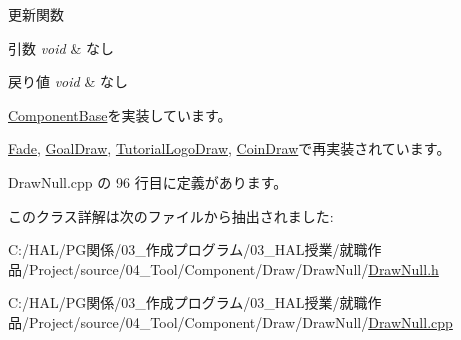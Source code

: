 更新関数 


\begin{DoxyParams}{引数}
{\em void} & なし \\
\hline
\end{DoxyParams}

\begin{DoxyRetVals}{戻り値}
{\em void} & なし \\
\hline
\end{DoxyRetVals}


\mbox{\hyperlink{class_component_base_a58e66d65bc8f3cd5ab67b4b2deab4fc2}{Component\+Base}}を実装しています。



\mbox{\hyperlink{class_fade_a1579b5b9020344a1131ea11c15f2c0bd}{Fade}}, \mbox{\hyperlink{class_goal_draw_a6e003277ed44eb9c800a616b6acbcb20}{Goal\+Draw}}, \mbox{\hyperlink{class_tutorial_logo_draw_af69405fcc8b20684a19e982726d93ffa}{Tutorial\+Logo\+Draw}}, \mbox{\hyperlink{class_coin_draw_a6157b17bf1706b85156aad0d88acfd7e}{Coin\+Draw}}で再実装されています。



 Draw\+Null.\+cpp の 96 行目に定義があります。



このクラス詳解は次のファイルから抽出されました\+:\begin{DoxyCompactItemize}
\item 
C\+:/\+H\+A\+L/\+P\+G関係/03\+\_\+作成プログラム/03\+\_\+\+H\+A\+L授業/就職作品/\+Project/source/04\+\_\+\+Tool/\+Component/\+Draw/\+Draw\+Null/\mbox{\hyperlink{_draw_null_8h}{Draw\+Null.\+h}}\item 
C\+:/\+H\+A\+L/\+P\+G関係/03\+\_\+作成プログラム/03\+\_\+\+H\+A\+L授業/就職作品/\+Project/source/04\+\_\+\+Tool/\+Component/\+Draw/\+Draw\+Null/\mbox{\hyperlink{_draw_null_8cpp}{Draw\+Null.\+cpp}}\end{DoxyCompactItemize}
